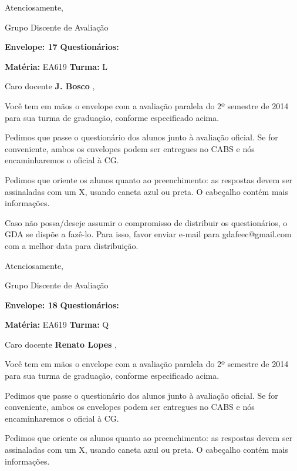 \documentclass[a5paper]{letter}
\begin{document}
Atenciosamente, 

Grupo Discente de Avaliação

\vspace{0.5cm}

{\bf Envelope: 17 }		\hfill	{\bf Questionários:} \hspace{2cm}

\newpage
\thispagestyle{empty}

\hfill {\bf Matéria:} EA619 {\bf Turma:} L

Caro docente {\bf J. Bosco }, 

	Você tem em mãos o envelope com a avaliação paralela do 2º semestre de 2014 para sua turma de graduação, conforme especificado acima.

	Pedimos que passe o questionário dos alunos junto à avaliação oficial. Se for conveniente, ambos os envelopes podem ser entregues no CABS e nós encaminharemos o oficial à CG.

Pedimos que oriente os alunos quanto ao preenchimento: as respostas devem ser assinaladas com um X, usando caneta azul ou preta. O cabeçalho contém mais informações.

	Caso não possa/deseje assumir o compromisso de distribuir os questionários, o GDA se dispõe a fazê-lo. Para isso, favor enviar e-mail para gdafeec@gmail.com com a melhor data para distribuição.


Atenciosamente, 

Grupo Discente de Avaliação

\vspace{0.5cm}

{\bf Envelope: 18 }		\hfill	{\bf Questionários:} \hspace{2cm}

\newpage
\thispagestyle{empty}

\hfill {\bf Matéria:} EA619 {\bf Turma:} Q

Caro docente {\bf Renato Lopes }, 

	Você tem em mãos o envelope com a avaliação paralela do 2º semestre de 2014 para sua turma de graduação, conforme especificado acima.

	Pedimos que passe o questionário dos alunos junto à avaliação oficial. Se for conveniente, ambos os envelopes podem ser entregues no CABS e nós encaminharemos o oficial à CG.

Pedimos que oriente os alunos quanto ao preenchimento: as respostas devem ser assinaladas com um X, usando caneta azul ou preta. O cabeçalho contém mais informações.
\end{document}
